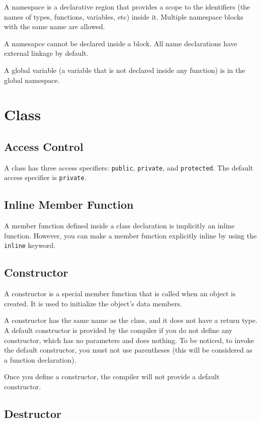 \documentclass[a4paper,12pt]{article}
\begin{document}
A namespace is a declarative region that provides a scope to the identifiers (the names of types, functions, variables, etc) inside it.
Multiple namespace blocks with the same name are allowed.

A namesapce cannot be declared inside a block.
All name declarations have external linkage by default.

A global variable (a variable that is not declared inside any function) is in the global namespace.

\section{Class}

\subsection{Access Control}

A class has three access specifiers: \texttt{public}, \texttt{private}, and \texttt{protected}.
The default access specifier is \texttt{private}.

\subsection{Inline Member Function}

A member function defined inside a class declaration is implicitly an inline function.
However, you can make a member function explicitly inline by using the \texttt{inline} keyword.

\subsection{Constructor}

A constructor is a special member function that is called when an object is created.
It is used to initialize the object's data members.

A constructor has the same name as the class, and it does not have a return type.
A default constructor is provided by the compiler if you do not define any constructor, which has no parameters and does nothing.
To be noticed, to invoke the default constructor, you must not use parentheses (this will be considered as a function declaration).

Once you define a constructor, the compiler will not provide a default constructor.
\subsection{Destructor}
\end{document}
